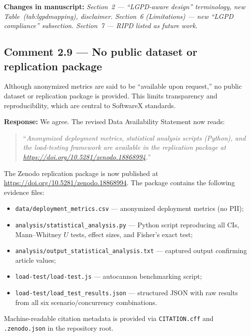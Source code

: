 \documentclass[11pt,a4paper]{article}
\newcommand{\response}[1]{\par\noindent\textcolor{responsecolor}{\textbf{Response:}} #1}
\newcommand{\change}[1]{\par\noindent\textcolor{changecolor}{\textbf{Changes in manuscript:}} \textit{#1}}
\begin{document}
\change{Section~2 --- ``LGPD-aware design'' terminology, new Table~(tab:lgpdmapping), disclaimer. Section~6 (Limitations) --- new ``LGPD compliance'' subsection. Section~7 --- RIPD listed as future work.}

\bigskip

\subsection*{Comment 2.9 --- No public dataset or replication package}

\begin{reviewerbox}
Although anonymized metrics are said to be ``available upon request,'' no public dataset or replication package is provided. This limits transparency and reproducibility, which are central to SoftwareX standards.
\end{reviewerbox}

\response{We agree. The revised Data Availability Statement now reads:}

\begin{quote}
``\textit{Anonymized deployment metrics, statistical analysis scripts (Python), and the load-testing framework are available in the replication package at \url{https://doi.org/10.5281/zenodo.18868994}.}''
\end{quote}

The Zenodo replication package is now published at \url{https://doi.org/10.5281/zenodo.18868994}. The package contains the following evidence files:
\begin{itemize}[nosep]
  \item \texttt{data/deployment\_metrics.csv} --- anonymized deployment metrics (no PII);
  \item \texttt{analysis/statistical\_analysis.py} --- Python script reproducing all CIs, Mann--Whitney $U$ tests, effect sizes, and Fisher's exact test;
  \item \texttt{analysis/output\_statistical\_analysis.txt} --- captured output confirming article values;
  \item \texttt{load-test/load-test.js} --- autocannon benchmarking script;
  \item \texttt{load-test/load\_test\_results.json} --- structured JSON with raw results from all six scenario/concurrency combinations.
\end{itemize}

Machine-readable citation metadata is provided via \texttt{CITATION.cff} and \texttt{.zenodo.json} in the repository root.
\end{document}
